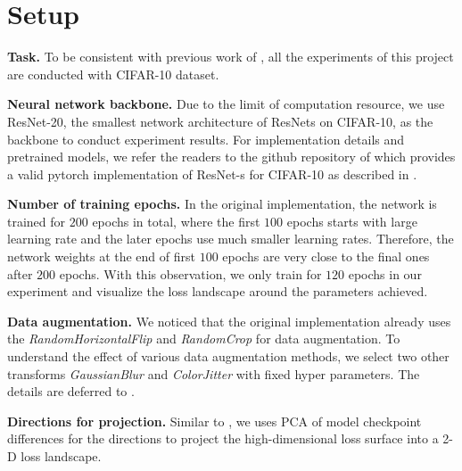 \section{Setup}
\label{sec:setup}

\textbf{Task.} 
To be consistent with previous work of \cite{li2018visualizing}, all the experiments of this project are conducted with CIFAR-10 dataset.   

\textbf{Neural network backbone.} 
Due to the limit of computation resource, we use ResNet-20, the smallest network architecture of ResNets on CIFAR-10,  as the backbone to conduct experiment results. 
For implementation details and pretrained models, we refer the readers to the github repository of \cite{Idelbayev18a} which provides a valid pytorch implementation of ResNet-s for CIFAR-10 as described in \cite{he2016deep}.


\textbf{Number of training epochs.} 
In the original implementation, the network is trained for $200$ epochs in total, where the first $100$ epochs starts with large learning rate and the later epochs use much smaller learning rates. 
Therefore, the network weights at the end of first $100$ epochs are very close to the final ones after $200$ epochs. 
With this observation, we only train for $120$ epochs in our experiment and visualize the loss landscape around the parameters achieved. 

\textbf{Data augmentation.} 
We noticed that the original implementation already uses the \textit{RandomHorizontalFlip} and \textit{RandomCrop} for data augmentation. 
To understand the effect of various data augmentation methods, we select two other transforms \textit{GaussianBlur} and \textit{ColorJitter} with fixed hyper parameters. 
The details are deferred to . 

\textbf{Directions for projection.}
Similar to \cite{li2018visualizing}, we uses PCA of model checkpoint differences for the directions to project the high-dimensional loss surface into a 2-D loss landscape. 
